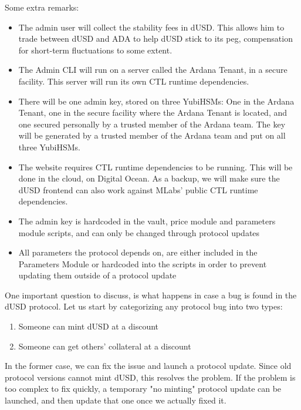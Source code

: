 \documentclass{article} %
\begin{document}
Some extra remarks:
\begin{itemize}
  \item The admin user will collect the stability fees in dUSD. This allows him
    to trade between dUSD and ADA to help dUSD stick to its peg, compensation
    for short-term fluctuations to some extent.
  \item The Admin CLI will run on a server called the Ardana Tenant, in a secure
    facility. This server will run its own CTL runtime dependencies.
  \item There will be one admin key, stored on three YubiHSMs: One in the Ardana
    Tenant, one in the secure facility where the Ardana Tenant is located, and
    one secured personally by a trusted member of the Ardana team. The key will
    be generated by a trusted member of the Ardana team and put on all three
    YubiHSMs.
  \item The website requires CTL runtime dependencies to be running. This will
    be done in the cloud, on Digital Ocean. As a backup, we will make sure the
    dUSD frontend can also work against MLabs' public CTL runtime dependencies.
  \item The admin key is hardcoded in the vault, price module and parameters
    module scripts, and can only be changed through protocol updates
  \item All parameters the protocol depends on, are either included in the
    Parameters Module or hardcoded into the scripts in order to prevent updating
    them outside of a protocol update
\end{itemize}

One important question to discuss, is what happens in case a bug is found in the
dUSD protocol. Let us start by categorizing any protocol bug into two types:
\begin{enumerate}
  \item Someone can mint dUSD at a discount
  \item Someone can get others' collateral at a discount
\end{enumerate}

In the former case, we can fix the issue and launch a protocol update. Since old
protocol versions cannot mint dUSD, this resolves the problem.
If the problem is too complex to fix quickly, a temporary "no minting" protocol
update can be launched, and then update that one once we actually fixed it. \\
\end{document}
